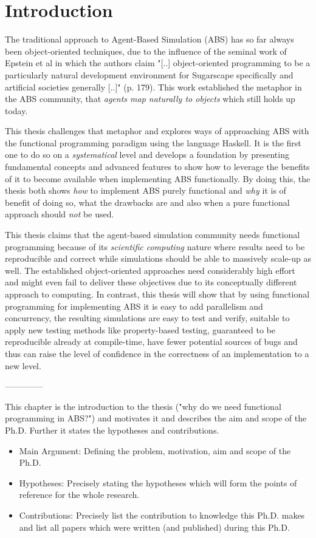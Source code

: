 \chapter{Introduction}
The traditional approach to Agent-Based Simulation (ABS) has so far always been object-oriented techniques, due to the influence of the seminal work of Epstein et al \cite{epstein_growing_1996} in which the authors claim "[..] object-oriented programming to be a particularly natural development environment for Sugarscape specifically and artificial societies generally [..]" (p. 179). This work established the metaphor in the ABS community, that \textit{agents map naturally to objects} \cite{north_managing_2007} which still holds up today.

This thesis challenges that metaphor and explores ways of approaching ABS with the functional programming paradigm using the language Haskell. It is the first one to do so on a \textit{systematical} level and develops a foundation by presenting fundamental concepts and advanced features to show how to leverage the benefits of it \cite{hudak_haskell_1994, hudak_history_2007} to become available when implementing ABS functionally. By doing this, the thesis both shows \textit{how} to implement ABS purely functional and \textit{why} it is of benefit of doing so, what the drawbacks are and also when a pure functional approach should \textit{not} be used. 

This thesis claims that the agent-based simulation community needs functional programming because of its \textit{scientific computing} nature where results need to be reproducible and correct while simulations should be able to massively scale-up as well. The established object-oriented approaches need considerably high effort and might even fail to deliver these objectives due to its conceptually different approach to computing. In contrast, this thesis will show that by using functional programming for implementing ABS it is easy to add parallelism and concurrency, the resulting simulations are easy to test and verify, suitable to apply new testing methods like property-based testing, guaranteed to be reproducible already at compile-time, have fewer potential sources of bugs and thus can raise the level of confidence in the correctness of an implementation to a new level.

--------------

This chapter is the introduction to the thesis ("why do we need functional programming in ABS?") and motivates it and describes the aim and scope of the Ph.D. Further it states the hypotheses and contributions. 
\begin{itemize}
	\item Main Argument: Defining the problem, motivation, aim and scope of the Ph.D.
	\item Hypotheses: Precisely stating the hypotheses which will form the points of reference for the whole research.
	\item Contributions: Precisely list the contribution to knowledge this Ph.D. makes and list all papers which were written (and published) during this Ph.D.
\end{itemize}

